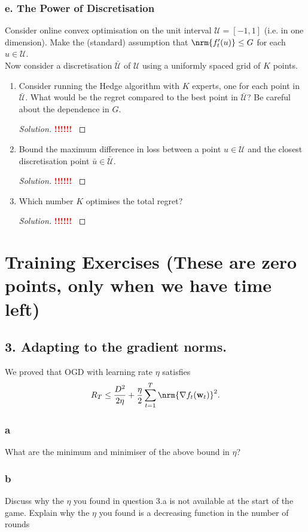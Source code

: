 \documentclass[10pt, a4paper, twoside]{amsart}
\theoremstyle{plain}
\DeclarePairedDelimiter{\nrm}\lVert\rVert
\newcommand{\cU}{\ensuremath{\mathcal{U}}}
\newcommand{\bw}{\ensuremath{\mathbf{w}}} %
\newenvironment{solution}
               {\let\oldqedsymbol=\qedsymbol
                \renewcommand{\qedsymbol}{$\blacktriangleleft$}
                \begin{proof}[Solution]}
               {\end{proof}
                \renewcommand{\qedsymbol}{\oldqedsymbol}}
\newcommand{\TODO}{\textcolor{red}{\textbf{!!!!!! }}}
\begin{document}
\subsubsection*{e. The Power of Discretisation} Consider online convex optimisation on the unit interval $\cU = [-1,1]$ (i.e. in one dimension). Make the (standard) assumption that $\nrm{f'_t(u)} \leq G$ for each $u \in \cU$.\\
Now consider a discretisation $\bar{\cU}$ of $\cU$ using a uniformly spaced grid of $K$ points.
\begin{enumerate}[i]
\item Consider running the Hedge algorithm with $K$ experts, one for each point in $\bar{\cU}$. What would be the regret compared to the best point in $\bar{\cU}$? Be careful about the dependence in $G$.
\begin{solution}
  \TODO
\end{solution}
\item Bound the maximum difference in loss between a point $u \in \cU$ and the closest discretisation point $\bar{u} \in \bar{\cU}$.
\begin{solution}
  \TODO
\end{solution}
\item Which number $K$ optimises the total regret?
\begin{solution}
  \TODO
\end{solution}
\end{enumerate}

\section{Training Exercises (These are zero points, only when we have time left)}
\subsection*{3. Adapting to the gradient norms.}
We proved that OGD with learning rate $\eta$ satisfies
\begin{equation*}
  R_T \leq \frac{D^2}{2 \eta} + \frac{\eta}{2} \sum_{t=1}^T \nrm{\nabla f_t (\bw_t)}^2.
\end{equation*}
\subsubsection*{a}
What are the minimum and minimiser of the above bound in $\eta$?

\subsubsection*{b}
Discuss why the $\eta$ you found in question 3.a is not available at the start of the game. Explain why the $\eta$ you found is a decreasing function in the number of rounds
\end{document}
